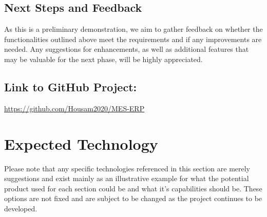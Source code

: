 \documentclass{article}
\begin{document}
\subsection{Next Steps and Feedback}

As this is a preliminary demonstration, we aim to gather feedback on whether the functionalities outlined above meet the requirements and if any improvements are needed. Any suggestions for enhancements, as well as additional features that may be valuable for the next phase, will be highly appreciated.

\subsection{Link to GitHub Project:} \href{https://github.com/Housam2020/MES-ERP}{https://github.com/Housam2020/MES-ERP} \\
\section{Expected Technology}

Please note that any specific technologies referenced in this section are merely suggestions and exist mainly as an illustrative example for what the potential product used for each section could be and what it's capabilities should be. These options are not fixed and are subject to be changed as the project continues to be developed.
\end{document}
